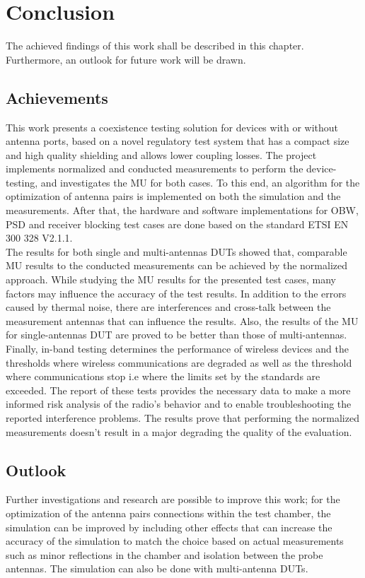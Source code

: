 \chapter{Conclusion} \label{chap:8}

The achieved findings of this work shall be described in this chapter. Furthermore, an outlook for future work will be drawn.

\section{Achievements}
This work presents a coexistence testing solution for devices with or without antenna ports, based on a novel regulatory test system that has a compact size and high quality shielding and allows lower coupling losses. The project implements normalized and conducted measurements to perform the device-testing, and investigates the \acf{MU} for both cases. To this end, an algorithm for the optimization of antenna pairs is implemented on both the simulation and the measurements. After that, the hardware and software implementations for \acf{OBW}, \acf{PSD} and receiver blocking test cases are done based on the standard ETSI EN 300 328 V2.1.1. \\

 The results for both single and multi-antennas \acsp{DUT} showed that, comparable \acf{MU} results to the conducted measurements can be achieved by the normalized approach. While studying the \acf{MU} results for the presented test cases, many factors may influence the accuracy of the test results. In addition to the errors caused by thermal noise, there are interferences and cross-talk between the measurement antennas that can influence the results. Also, the results of the \acf{MU} for single-antennas \acs{DUT} are proved to be better than those of multi-antennas. \\
 
 Finally, in-band testing determines the performance of wireless devices and the thresholds where wireless communications are degraded as well as the threshold where communications stop i.e where the limits set by the standards are exceeded. The report of these tests provides the necessary data to make a more informed risk analysis of the radio's behavior and to enable troubleshooting the reported interference problems. The results prove that performing the normalized measurements doesn't result in a major degrading the quality of the evaluation.


\section{Outlook}
Further investigations and research are possible to improve this work; for the optimization of the antenna pairs connections within the test chamber, the simulation can be improved by including other effects that can increase the accuracy of the simulation to match the choice based on actual measurements such as minor reflections in the chamber and isolation between the probe antennas. The simulation can also be done with multi-antenna \acsp{DUT}. \\

